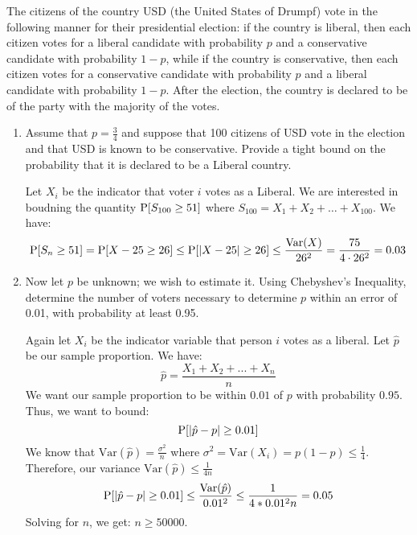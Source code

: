 
\question The citizens of the country USD (the United States of Drumpf) 
vote in the following manner for their presidential election: if the 
country is liberal, then each citizen votes
for a liberal candidate with probability $p$ and a conservative candidate 
with probability $1-p$, while if the country is conservative, then 
each citizen votes for a conservative candidate with probability $p$ and 
a liberal candidate with probability $1-p$. After the
election, the country is declared to be of the party with the majority of the votes.
\begin{enumerate}[label=(\alph*)]
\item Assume that $p = \frac{3}{4}$ and suppose that 100 citizens of 
USD vote in the election and that USD is known to be conservative. 
Provide a tight bound on the probability that it is declared to be a 
Liberal country.
\begin{solution}[2cm]
Let $X_i$ be the indicator that voter $i$ votes as a Liberal. We are interested
in boudning the quantity $\P[S_{100} \geq 51]$ where $S_{100} = X_1 + X_2
+ \dotsc + X_{100}$. We have:
\[\P[S_n \geq 51] = \P[X-25 \geq 26] \leq \P[|X-25| \geq 26] \leq 
\frac{\var (X)}{26^2} = \frac{75}{4 \cdot 26^2} = 0.03\]
\end{solution}

\item Now let $p$ be unknown; we wish to estimate it. Using Chebyshev's Inequality, determine the number of voters necessary to determine $p$ within an error of 0.01, with probability at least 0.95.
\begin{solution}[2 cm]
Again let $X_i$ be the indicator variable that person $i$ votes as a liberal. \newline 
Let $\hat{p}$ be our sample proportion. \newline 
We have: 
\[\hat{p} = \frac{X_1 + X_2 + ... + X_n}{n}\] 
We want our sample proportion to be within $0.01$ of $p$ with probability $0.95$. \newline
Thus, we want to bound:  
\[\P[|\hat{p} - p| \geq 0.01]\]
We know that $\mathrm{Var}(\hat{p}) = \frac{\sigma^2}{n}$ where $\sigma^2 = \mathrm{Var}(X_i) = p(1-p) \leq \frac{1}{4}$. \newline 
Therefore, our variance $\mathrm{Var}(\hat{p}) \leq \frac{1}{4n}$
\[\P[|\hat{p} - p| \geq 0.01] \leq \frac{\mathrm{Var}(\hat{p})}{0.01^2} \leq \frac{1}{4 * 0.01^2 n} = 0.05\]
Solving for $n$, we get: $n \geq 50000$. 


\end{solution}
\end{enumerate}